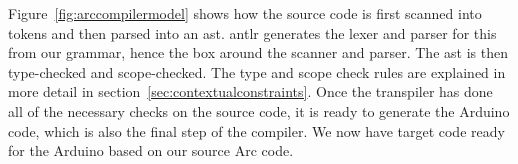 Figure~\ref{fig:arccompilermodel} shows how the source code is first scanned into tokens and then parsed into an \gls{ast}. \gls{antlr} generates the lexer and parser for this from our grammar, hence the box around the scanner and parser. The \gls{ast} is then type-checked and scope-checked. The type and scope check rules are explained in more detail in section~\ref{sec:contextualconstraints}. Once the transpiler has done all of the necessary checks on the source code, it is ready to generate the Arduino code, which is also the final step of the compiler. We now have target code ready for the Arduino based on our source Arc code.